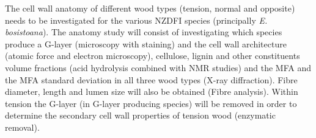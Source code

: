 The cell wall anatomy of different wood types (tension, normal and opposite)
needs to be investigated for the various NZDFI species (principally \textit{E.
bosistoana}). The anatomy study will consist of investigating which species
produce a G-layer (microscopy with staining) and the cell wall architecture
(atomic force and electron microscopy), cellulose, lignin and other constituents
volume fractions (acid hydrolysis combined with NMR studies)  and the MFA and
the MFA standard deviation in all three wood types (X-ray diffraction). Fibre
diameter, length and lumen size will also be obtained (Fibre analysis). Within
tension the G-layer (in G-layer producing species) will be
removed in order to determine the secondary cell wall properties of tension wood
(enzymatic removal).